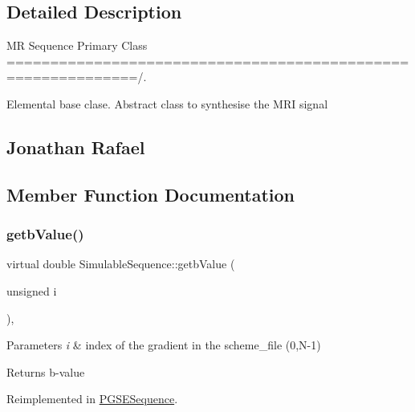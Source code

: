 \subsection{Detailed Description}
MR Sequence Primary Class =============================================================/. 

Elemental base clase. Abstract class to synthesise the M\+RI signal

\subsection*{Jonathan Rafael }

\subsection{Member Function Documentation}
\mbox{\label{class_simulable_sequence_a85cdcf5f7bd5bed804a816e3c18840b7}} 
\subsubsection{\texorpdfstring{getb\+Value()}{getbValue()}}
{\footnotesize\ttfamily virtual double Simulable\+Sequence\+::getb\+Value (\begin{DoxyParamCaption}\item[{unsigned}]{i }\end{DoxyParamCaption})\hspace{0.3cm}{\ttfamily [inline]}, {\ttfamily [virtual]}}


\begin{DoxyParams}{Parameters}
{\em i} & index of the gradient in the scheme\+\_\+file (0,N-\/1) \\
\hline
\end{DoxyParams}
\begin{DoxyReturn}{Returns}
b-\/value 
\end{DoxyReturn}


Reimplemented in \hyperlink{class_p_g_s_e_sequence_a8b0671a505f79a601d3d4d2d9b7f36cc}{P\+G\+S\+E\+Sequence}.

\mbox{\label{class_simulable_sequence_a03a417776f5404b06c761ab9109e3e1d}} 
